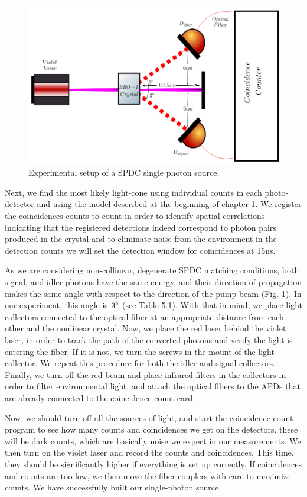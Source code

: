 \documentclass[12pt]{book}
\begin{document}
\begin{figure}[t!]
\centering
\includegraphics[scale=0.3]{images/sPDC.png}
\caption{Experimental setup of a SPDC single photon source.}
\label{single}
\end{figure}

Next, we find the most likely light-cone using individual counts in each photo-detector and using the model described at the beginning of chapter 1. We register the coincidences counts to count in order to identify spatial correlations indicating that the registered detections indeed correspond to photon pairs produced in the crystal and to eliminate noise from the environment in the detection counts we will set the detection window for coincidences at 15ns.

 As we are considering non-collinear, degenerate SPDC matching conditions, both signal, and idler photons have the same energy, and their direction of propagation makes the same angle with respect to the direction of the pump beam (Fig. \ref{single}). In our experiment, this angle is $3\degree$ (see Table 5.1). With that in mind, we place light collectors connected to the optical fiber at an appropriate distance from each other and the nonlinear crystal. Now, we place the red laser behind the violet laser, in order to track the path of the converted photons and verify the light is entering the fiber. If it is not, we turn the screws in the mount of the light collector. We repeat this procedure for both the idler and signal collectors. Finally, we turn off the red beam and place infrared filters in the collectors in order to filter environmental light, and attach the optical fibers to the APDs that are already connected to the coincidence count card.

Now, we should turn off all the sources of light, and start the coincidence count program to see how many counts and coincidences we get on the detectors. these will be dark counts, which are basically noise we expect in our measurements. We then turn on the violet laser and record the counts and coincidences. This time, they should be significantly higher if everything is set up correctly. If coincidences and counts are too low, we then move the fiber couplers with care to maximize counts. We have successfully built our single-photon source.
\end{document}

